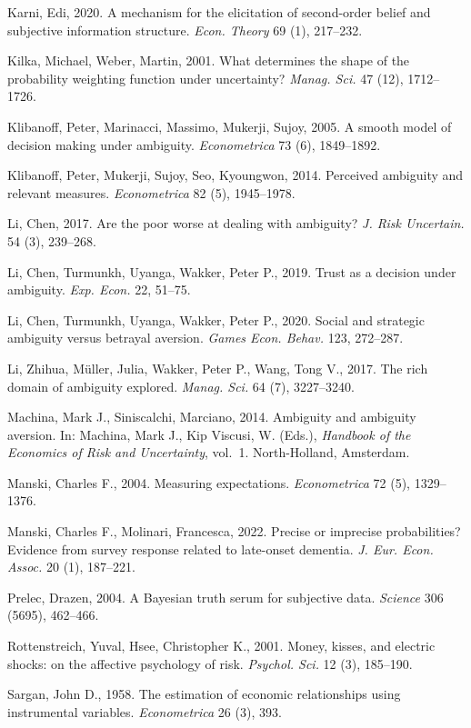 \documentclass[12pt,a4paper]{article}
\newenvironment{original}
  {\par\medskip\noindent\color{black}\ignorespaces}
  {\par\medskip}
\begin{document}
\begin{original}
\noindent Karni, Edi, 2020. A mechanism for the elicitation of second-order belief and subjective information structure. \textit{Econ. Theory} 69 (1), 217--232.

\noindent Kilka, Michael, Weber, Martin, 2001. What determines the shape of the probability weighting function under uncertainty? \textit{Manag. Sci.} 47 (12), 1712--1726.

\noindent Klibanoff, Peter, Marinacci, Massimo, Mukerji, Sujoy, 2005. A smooth model of decision making under ambiguity. \textit{Econometrica} 73 (6), 1849--1892.

\noindent Klibanoff, Peter, Mukerji, Sujoy, Seo, Kyoungwon, 2014. Perceived ambiguity and relevant measures. \textit{Econometrica} 82 (5), 1945--1978.

\noindent Li, Chen, 2017. Are the poor worse at dealing with ambiguity? \textit{J. Risk Uncertain.} 54 (3), 239--268.

\noindent Li, Chen, Turmunkh, Uyanga, Wakker, Peter P., 2019. Trust as a decision under ambiguity. \textit{Exp. Econ.} 22, 51--75.

\noindent Li, Chen, Turmunkh, Uyanga, Wakker, Peter P., 2020. Social and strategic ambiguity versus betrayal aversion. \textit{Games Econ. Behav.} 123, 272--287.

\noindent Li, Zhihua, M\"{u}ller, Julia, Wakker, Peter P., Wang, Tong V., 2017. The rich domain of ambiguity explored. \textit{Manag. Sci.} 64 (7), 3227--3240.

\noindent Machina, Mark J., Siniscalchi, Marciano, 2014. Ambiguity and ambiguity aversion. In: Machina, Mark J., Kip Viscusi, W. (Eds.), \textit{Handbook of the Economics of Risk and Uncertainty}, vol.\ 1. North-Holland, Amsterdam.

\noindent Manski, Charles F., 2004. Measuring expectations. \textit{Econometrica} 72 (5), 1329--1376.

\noindent Manski, Charles F., Molinari, Francesca, 2022. Precise or imprecise probabilities? Evidence from survey response related to late-onset dementia. \textit{J. Eur. Econ. Assoc.} 20 (1), 187--221.

\noindent Prelec, Drazen, 2004. A Bayesian truth serum for subjective data. \textit{Science} 306 (5695), 462--466.

\noindent Rottenstreich, Yuval, Hsee, Christopher K., 2001. Money, kisses, and electric shocks: on the affective psychology of risk. \textit{Psychol. Sci.} 12 (3), 185--190.

\noindent Sargan, John D., 1958. The estimation of economic relationships using instrumental variables. \textit{Econometrica} 26 (3), 393.


\end{original}
\end{document}
